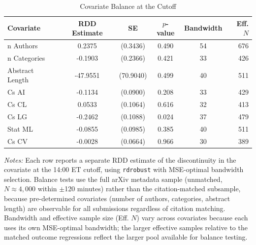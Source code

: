 \begin{table}[htbp]
\centering
\caption{Covariate Balance at the Cutoff}
\label{tab:balance}
\begin{tabular}{lccccr}
\hline\hline
Covariate & RDD Estimate & SE & $p$-value & Bandwidth & Eff. $N$ \\
\hline
n Authors & 0.2375 & (0.3436) & 0.490 & 54 & 676 \\
n Categories & -0.1903 & (0.2366) & 0.421 & 33 & 426 \\
Abstract Length & -47.9551 & (70.9040) & 0.499 & 40 & 511 \\
Cs AI & -0.1134 & (0.0900) & 0.208 & 33 & 429 \\
Cs CL & 0.0533 & (0.1064) & 0.616 & 32 & 413 \\
Cs LG & -0.2462 & (0.1088) & 0.024 & 37 & 479 \\
Stat ML & -0.0855 & (0.0985) & 0.385 & 40 & 511 \\
Cs CV & -0.0028 & (0.0664) & 0.966 & 30 & 389 \\
\hline\hline
\end{tabular}
\begin{minipage}{0.95\textwidth}
\footnotesize
\textit{Notes:} Each row reports a separate RDD estimate of the discontinuity in the covariate at the 14:00 ET cutoff, using \texttt{rdrobust} with MSE-optimal bandwidth selection. Balance tests use the full arXiv metadata sample (unmatched, $N \approx 4{,}000$ within $\pm$120 minutes) rather than the citation-matched subsample, because pre-determined covariates (number of authors, categories, abstract length) are observable for all submissions regardless of citation matching. Bandwidth and effective sample size (Eff. $N$) vary across covariates because each uses its own MSE-optimal bandwidth; the larger effective samples relative to the matched outcome regressions reflect the larger pool available for balance testing.
\end{minipage}
\end{table}
